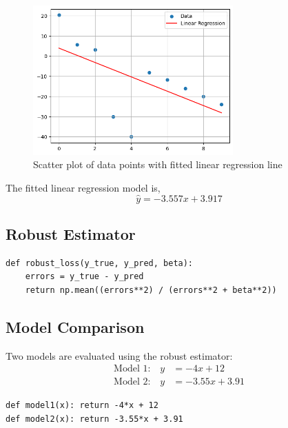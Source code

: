 \documentclass[12pt]{article}
\begin{document}
\begin{figure}[H]
    \centering
    \includegraphics[width=0.685\textwidth]{resources/linear_regression_plot.png}
    \caption{\footnotesize Scatter plot of data points with fitted linear regression line}
    \label{fig:linear_regression}
\end{figure}

The fitted linear regression model is,
\begin{equation}
\hat{y} = -3.557x + 3.917
\label{eq:fitted_model}
\end{equation}

\subsection{Robust Estimator}
\begin{lstlisting}[caption={\footnotesize Robust Loss Function Implementation}]
def robust_loss(y_true, y_pred, beta):
    errors = y_true - y_pred
    return np.mean((errors**2) / (errors**2 + beta**2))
\end{lstlisting}

\subsection{Model Comparison}

Two models are evaluated using the robust estimator:
\begin{align}
\text{Model 1:} \quad y &= -4x + 12 \label{eq:model1} \\
\text{Model 2:} \quad y &= -3.55x + 3.91 \label{eq:model2}
\end{align}

\begin{lstlisting}[caption={\footnotesize Linear models}]
def model1(x): return -4*x + 12
def model2(x): return -3.55*x + 3.91
\end{lstlisting}
\end{document}
